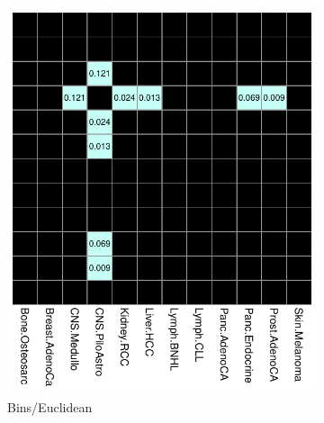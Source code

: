 \begin{figure}[ht!]
    \begin{subfigure}{.5\textwidth}
    \includegraphics[scale=0.7]{graphics/bootstrap_bins_euclidean.pdf}
    \caption{Bins/Euclidean}
    \label{fig:bootstrap_bins_euclidean}
    \end{subfigure}
    ~
    \begin{subfigure}{.5\textwidth}
    

\end{subfigure}
\end{figure}
